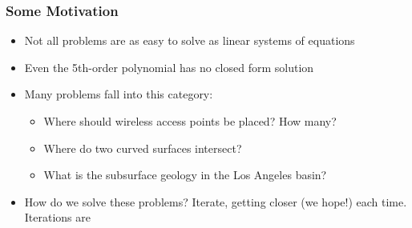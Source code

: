 \documentclass[10pt]{beamer}
\begin{document}
\begin{frame}
\frametitle{Some Motivation}
\begin{itemize}
  \item Not all problems are as easy to solve as linear systems of equations
  \item Even the 5th-order polynomial has no closed form solution
  \item Many problems fall into this category:
  \begin{itemize}
     \item Where should wireless access points be placed?  How many?
     \item Where do two curved surfaces intersect?
     \item What is the subsurface geology in the Los Angeles basin?
  \end{itemize}
  \item How do we solve these problems?  Iterate, getting closer (we hope!) 
    each time.  Iterations are 
\end{itemize}
\end{frame}
\end{document}
